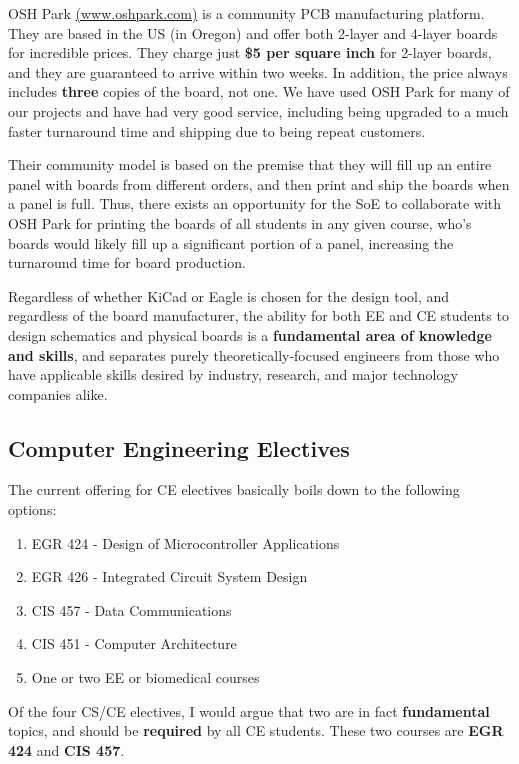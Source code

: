 \documentclass[12pt]{article}
\numberwithin{figure}{section}
\numberwithin{equation}{section}
\begin{document}
{OSH Park \href{www.oshpark.com}{(www.oshpark.com)} is a community PCB
manufacturing platform. They are based in the US (in Oregon) and offer
both 2-layer and 4-layer boards for incredible prices. They charge just
\textbf{\$5 per square inch} for 2-layer boards, and they are guaranteed
to arrive within two weeks. In addition, the price always includes
\textbf{three} copies of the board, not one. We have used OSH Park for
many of our projects and have had very good service, including being
upgraded to a much faster turnaround time and shipping due to being
repeat customers.

\bigskip

Their community model is based on the premise that they will fill up an
entire panel with boards from different orders, and then print and ship
the boards when a panel is full. Thus, there exists an opportunity for
the SoE to collaborate with OSH Park for printing the boards of all
students in any given course, who's boards would likely fill up a
significant portion of a panel, increasing the turnaround time for board
production.

\bigskip

Regardless of whether KiCad or Eagle is chosen for the design tool, and
regardless of the board manufacturer, the ability for both EE and CE
students to design schematics and physical boards is a
\textbf{fundamental area of knowledge and skills}, and separates purely
theoretically-focused engineers from those who have applicable skills
desired by industry, research, and major technology companies alike.

\subsection{Computer Engineering Electives}\label{electives}
The current offering for CE electives basically boils down to the
following options:

\begin{enumerate}
\itemsep1pt\parskip0pt
\item EGR 424 - Design of Microcontroller Applications
\item EGR 426 - Integrated Circuit System Design
\item CIS 457 - Data Communications
\item CIS 451 - Computer Architecture
\item One or two EE or biomedical courses
\end{enumerate}

Of the four CS/CE electives, I would argue that two are in fact
\textbf{fundamental} topics, and should be \textbf{required} by all CE
students. These two courses are \textbf{EGR 424} and \textbf{CIS 457}.

}
\end{document}
